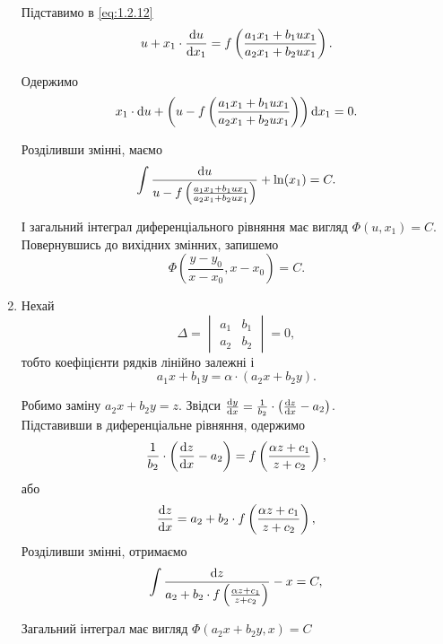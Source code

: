 \begin{enumerate}
	Підставимо в \eqref{eq:1.2.12}
	\begin{equation}
		\label{eq:1.2.13}
		u + x_1 \cdot \frac{\mathop{}\!\mathrm{d} u}{\mathop{}\!\mathrm{d} x_1} = f \left( \frac{a_1 x_1 + b_1 u x_1}{a_2 x_1 + b_2 u x_1} \right).
	\end{equation}
	
	Одержимо
	\begin{equation}
		\label{eq:1.2.14}
		x_1 \cdot \mathop{}\!\mathrm{d} u + \left( u - f \left( \frac{a_1 x_1 + b_1 u x_1}{a_2 x_1 + b_2 u x_1} \right) \right) \mathop{}\!\mathrm{d} x_1 = 0.
	\end{equation}

	Розділивши змінні, маємо
	\begin{equation}
		\label{eq:1.2.15}
		\int \frac{\mathop{}\!\mathrm{d} u}{u - f \left( \frac{a_1 x_1 + b_1 u x_1}{a_2 x_1 + b_2 u x_1} \right)} + \ln (x_1) = C.
	\end{equation}

	І загальний інтеграл диференціального рівняння має вигляд $\Phi(u, x_1) = C$. Повернувшись до вихідних змінних, запишемо
	\begin{equation}
		\label{eq:1.2.16}
		\Phi \left( \frac{y - y_0}{x - x_0}, x - x_0 \right) = C.
	\end{equation}

	\item Нехай 
	\begin{equation}
		\label{eq:1.2.17}
		\Delta = \begin{vmatrix} a_1 & b_1 \\ a_2 & b_2 \end{vmatrix} = 0,
	\end{equation}
	тобто коефіцієнти рядків лінійно залежні і
	\begin{equation}
		\label{eq:1.2.18}
		a_1 x + b_1 y = \alpha \cdot (a_2 x + b_2 y).
	\end{equation}

	Робимо заміну $a_2 x + b_2 y = z$. Звідси $\frac{\mathop{}\!\mathrm{d} y}{\mathop{}\!\mathrm{d} x} = \frac{1}{b_2} \cdot \left( \frac{\mathop{}\!\mathrm{d} z}{\mathop{}\!\mathrm{d} x} - a_2 \right)$. \\

	Підставивши в диференціальне рівняння, одержимо
	\begin{equation}
		\label{eq:1.2.19}
		\frac{1}{b_2} \cdot \left( \frac{\mathop{}\!\mathrm{d} z}{\mathop{}\!\mathrm{d} x} - a_2 \right) = f \left ( \frac{\alpha z + c_1}{z + c_2} \right),
	\end{equation}
	або
	\begin{equation}
		\label{eq:1.2.20}
		\frac{\mathop{}\!\mathrm{d} z}{\mathop{}\!\mathrm{d} x} = a_2 + b_2 \cdot f \left ( \frac{\alpha z + c_1}{z + c_2} \right),
	\end{equation}
	Розділивши змінні, отримаємо
	\begin{equation}
		\label{eq:1.2.21}
		\int \frac{\mathop{}\!\mathrm{d} z}{a_2 + b_2 \cdot f \left ( \frac{\alpha z + c_1}{z + c_2} \right)} - x = C,
	\end{equation}

	Загальний інтеграл має вигляд $\Phi(a_2 x + b_2 y, x) = C$
\end{enumerate}


